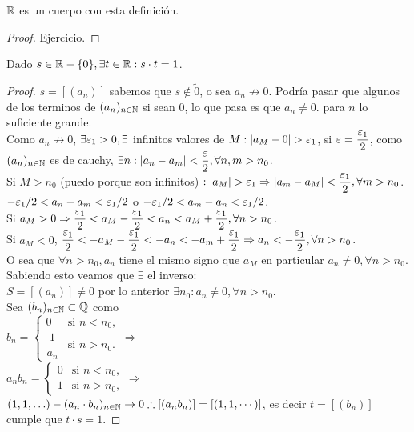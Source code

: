 \begin{prop}
	\(\mathbb{R} \) es un cuerpo con esta definición.
	\begin{proof}
		Ejercicio.
	\end{proof}
\end{prop}

\begin{theorem}
	Dado \(s \in \mathbb{R} - \{0\}, \exists t \in \mathbb{R} : s \cdot t = 1\).
	\begin{proof}
		\(s = [(a_n)]\) sabemos que \(s \notin \tilde{0} \), o sea \(a_n \not \to 0\). Podría pasar que algunos de los terminos de \((a_n)_{n \in \mathbb{N}} \) si sean \(0\), lo que pasa es que \(a_n \neq 0.\) para \(n\) lo suficiente grande. \\
		Como \(a_n \not \to 0\), \(\exists \varepsilon_1 > 0, \exists \) infinitos valores de \(M: |a_M - 0| > \varepsilon_1\), si \(\varepsilon = \dfrac{\varepsilon_1}{2} \), como \((a_n)_{n \in \mathbb{N}} \) es de cauchy, \(\exists n : |a_n - a_m| < \dfrac{\varepsilon}{2}, \forall n, m > n_0\). \\
		Si \(M > n_0\) (puedo porque son infinitos) \(: |a_M| > \varepsilon_1 \Rightarrow |a_m - a_M| < \dfrac{\varepsilon_1}{2}, \forall m > n_0\). \\
		\(-\varepsilon_1/2 < a_n - a_m < \varepsilon_1 / 2\) o \(-\varepsilon_1 / 2 < a_m - a_n < \varepsilon_1 / 2\). \\
		Si \(a_M > 0 \Rightarrow \dfrac{\varepsilon_1}{2} < a_M - \dfrac{\varepsilon_1}{2} < a_n < a_M + \dfrac{\varepsilon_1}{2}, \forall n > n_0\). \\
		Si \(a_M < 0\), \(\dfrac{\varepsilon_1}{2} < -a_M - \dfrac{\varepsilon_1}{2} < -a_n<-a_m+ \dfrac{\varepsilon_1}{2} \Rightarrow a_n < -\dfrac{\varepsilon_1}{2}, \forall n > n_0\). \\
		O sea que \(\forall n > n_0, a_n\) tiene el mismo signo que \(a_M\) en particular \(a_n \neq 0, \forall n > n_0\). \\
		Sabiendo esto veamos que \(\exists \) el inverso: \\
		\(S = [(a_n)] \neq 0\) por lo anterior \(\exists n_0 : a_n \neq 0, \forall n > n_0\). \\
		Sea \((b_n)_{n \in \mathbb{N}} \subset \mathbb{Q} \) como \\
		\(b_n = \begin{cases}
			0              & \text{si } n < n_0, \\
			\dfrac{1}{a_n} & \text{si } n > n_0.
		\end{cases} \Rightarrow \) \\

		\(a_n b_n = \begin{cases}
			0 & \text{si } n < n_0, \\
			1 & \text{si } n > n_0,
		\end{cases} \Rightarrow \) \\

		\((1, 1, \ldots) - (a_n \cdot b_n)_{n \in \mathbb{N}} \to 0 \therefore [(a_n b_n)] = [(1, 1, \cdots)]\), es decir \(t = [(b_n)]\) cumple que \(t \cdot s = 1\).
	\end{proof}
\end{theorem}

